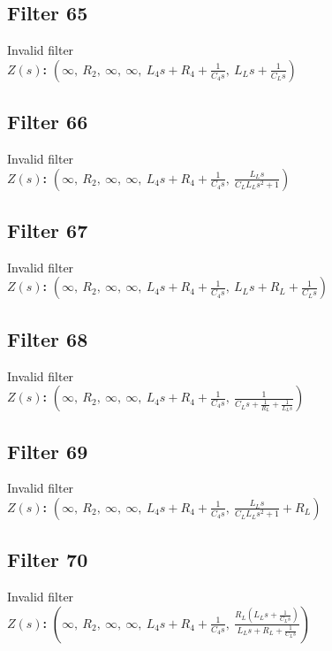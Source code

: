 \documentclass{article}
\begin{document}
\subsection*{Filter 65}
Invalid filter \\ 
\textbf{$Z(s)$:} $\left( \infty, \  R_{2}, \  \infty, \  \infty, \  L_{4} s + R_{4} + \frac{1}{C_{4} s}, \  L_{L} s + \frac{1}{C_{L} s}\right)$ \\ 
\subsection*{Filter 66}
Invalid filter \\ 
\textbf{$Z(s)$:} $\left( \infty, \  R_{2}, \  \infty, \  \infty, \  L_{4} s + R_{4} + \frac{1}{C_{4} s}, \  \frac{L_{L} s}{C_{L} L_{L} s^{2} + 1}\right)$ \\ 
\subsection*{Filter 67}
Invalid filter \\ 
\textbf{$Z(s)$:} $\left( \infty, \  R_{2}, \  \infty, \  \infty, \  L_{4} s + R_{4} + \frac{1}{C_{4} s}, \  L_{L} s + R_{L} + \frac{1}{C_{L} s}\right)$ \\ 
\subsection*{Filter 68}
Invalid filter \\ 
\textbf{$Z(s)$:} $\left( \infty, \  R_{2}, \  \infty, \  \infty, \  L_{4} s + R_{4} + \frac{1}{C_{4} s}, \  \frac{1}{C_{L} s + \frac{1}{R_{L}} + \frac{1}{L_{L} s}}\right)$ \\ 
\subsection*{Filter 69}
Invalid filter \\ 
\textbf{$Z(s)$:} $\left( \infty, \  R_{2}, \  \infty, \  \infty, \  L_{4} s + R_{4} + \frac{1}{C_{4} s}, \  \frac{L_{L} s}{C_{L} L_{L} s^{2} + 1} + R_{L}\right)$ \\ 
\subsection*{Filter 70}
Invalid filter \\ 
\textbf{$Z(s)$:} $\left( \infty, \  R_{2}, \  \infty, \  \infty, \  L_{4} s + R_{4} + \frac{1}{C_{4} s}, \  \frac{R_{L} \left(L_{L} s + \frac{1}{C_{L} s}\right)}{L_{L} s + R_{L} + \frac{1}{C_{L} s}}\right)$ \\ 
\end{document}
